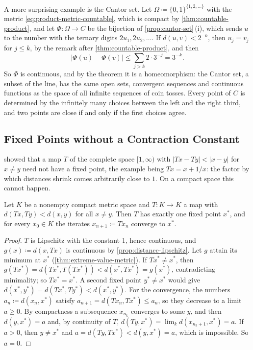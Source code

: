 A more surprising example is the Cantor set. Let $\Omega\coloneqq\{0,1\}^{\{1,2,\ldots\}}$ with the metric \eqref{eq:product-metric-countable}, which is compact by \cref{thm:countable-product}, and let $\Phi\colon\Omega\to C$ be the bijection of \cref{prop:cantor-set}\,(i), which sends $u$ to the number with the ternary digits $2u_1,2u_2,\ldots$. If $d(u,v)<2^{-k}$, then $u_j=v_j$ for $j\le k$, by the remark after \cref{thm:countable-product}, and then
\[
|\Phi(u)-\Phi(v)|\le\sum_{j>k}2\cdot3^{-j}=3^{-k} .
\]
So $\Phi$ is continuous, and by the theorem it is a homeomorphism: the Cantor set, a subset of the line, has the same open sets, convergent sequences and continuous functions as the space of all infinite sequences of coin tosses. Every point of $C$ is determined by the infinitely many choices between the left and the right third, and two points are close if and only if the first choices agree.

\subsection{Fixed Points without a Contraction Constant}

 showed that a map $T$ of the complete space $[1,\infty)$ with $|Tx-Ty|<|x-y|$ for $x\ne y$ need not have a fixed point, the example being $Tx=x+1/x$: the factor by which distances shrink comes arbitrarily close to $1$. On a compact space this cannot happen.

\begin{theorem}[Edelstein]
\label{thm:edelstein}
Let $K$ be a nonempty compact metric space and $T\colon K\to K$ a map with $d(Tx,Ty)<d(x,y)$ for all $x\ne y$. Then $T$ has exactly one fixed point $x^*$, and for every $x_0\in K$ the iterates $x_{n+1}\coloneqq Tx_n$ converge to $x^*$.
\end{theorem}

\begin{proof}
$T$ is Lipschitz with the constant $1$, hence continuous, and $g(x)\coloneqq d(x,Tx)$ is continuous by \cref{prop:distance-lipschitz}. Let $g$ attain its minimum at $x^*$ (\cref{thm:extreme-value-metric}). If $Tx^*\ne x^*$, then $g(Tx^*)=d(Tx^*,T(Tx^*))<d(x^*,Tx^*)=g(x^*)$, contradicting minimality; so $Tx^*=x^*$. A second fixed point $y^*\ne x^*$ would give $d(x^*,y^*)=d(Tx^*,Ty^*)<d(x^*,y^*)$. For the convergence, the numbers $a_n\coloneqq d(x_n,x^*)$ satisfy $a_{n+1}=d(Tx_n,Tx^*)\le a_n$, so they decrease to a limit $a\ge0$. By compactness a subsequence $x_{n_k}$ converges to some $y$, and then $d(y,x^*)=a$ and, by continuity of $T$, $d(Ty,x^*)=\lim_kd(x_{n_k+1},x^*)=a$. If $a>0$, then $y\ne x^*$ and $a=d(Ty,Tx^*)<d(y,x^*)=a$, which is impossible. So $a=0$.
\end{proof}

